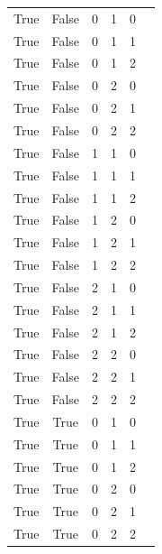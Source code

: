 {\begin{longtable}{c | c | c | c | c | c}
		True & False & 0 & 1 & 0 &  \\
		True & False & 0 & 1 & 1 &  \\
		True & False & 0 & 1 & 2 &  \\
		True & False & 0 & 2 & 0 &  \\
		True & False & 0 & 2 & 1 &  \\
		True & False & 0 & 2 & 2 &  \\
		True & False & 1 & 1 & 0 &  \\
		True & False & 1 & 1 & 1 &  \\
		True & False & 1 & 1 & 2 &  \\
		True & False & 1 & 2 & 0 &  \\
		True & False & 1 & 2 & 1 &  \\
		True & False & 1 & 2 & 2 &  \\
		True & False & 2 & 1 & 0 &  \\
		True & False & 2 & 1 & 1 &  \\
		True & False & 2 & 1 & 2 &  \\
		True & False & 2 & 2 & 0 &  \\
		True & False & 2 & 2 & 1 &  \\
		True & False & 2 & 2 & 2 &  \\
		True & True & 0 & 1 & 0 &  \\
		True & True & 0 & 1 & 1 &  \\
		True & True & 0 & 1 & 2 &  \\
		True & True & 0 & 2 & 0 &  \\
		True & True & 0 & 2 & 1 &  \\
		True & True & 0 & 2 & 2 &  \\
	\hline\hline
\end{longtable}
}
